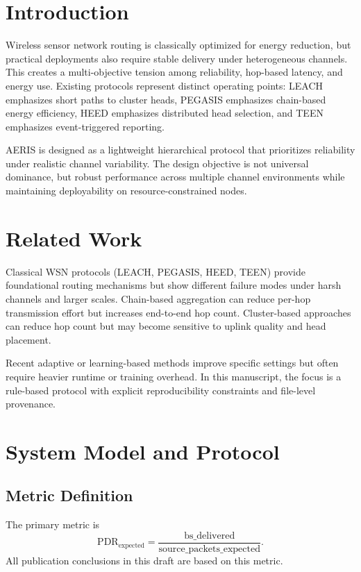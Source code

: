 \documentclass[sensors,article,submit,moreauthors,pdftex]{Definitions/mdpi}
\begin{document}
\section{Introduction}
Wireless sensor network routing is classically optimized for energy reduction, but practical deployments also require stable delivery under heterogeneous channels. This creates a multi-objective tension among reliability, hop-based latency, and energy use. Existing protocols represent distinct operating points: LEACH emphasizes short paths to cluster heads, PEGASIS emphasizes chain-based energy efficiency, HEED emphasizes distributed head selection, and TEEN emphasizes event-triggered reporting.

AERIS is designed as a lightweight hierarchical protocol that prioritizes reliability under realistic channel variability. The design objective is not universal dominance, but robust performance across multiple channel environments while maintaining deployability on resource-constrained nodes.

\section{Related Work}
Classical WSN protocols (LEACH, PEGASIS, HEED, TEEN) provide foundational routing mechanisms but show different failure modes under harsh channels and larger scales. Chain-based aggregation can reduce per-hop transmission effort but increases end-to-end hop count. Cluster-based approaches can reduce hop count but may become sensitive to uplink quality and head placement.

Recent adaptive or learning-based methods improve specific settings but often require heavier runtime or training overhead. In this manuscript, the focus is a rule-based protocol with explicit reproducibility constraints and file-level provenance.

\section{System Model and Protocol}
\subsection{Metric Definition}
The primary metric is
\begin{equation}
\mathrm{PDR}_{\mathrm{expected}} = \frac{\mathrm{bs\_delivered}}{\mathrm{source\_packets\_expected}}.
\end{equation}
All publication conclusions in this draft are based on this metric.
\end{document}
